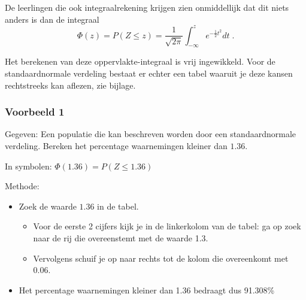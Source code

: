 \documentclass[a4paper,12pt, twoside]{article}
\begin{document}
\begin{center}
\end{center}

De leerlingen die ook integraalrekening krijgen zien onmiddellijk dat dit niets anders is dan de integraal
$$\Phi(z)=P(Z\leq z)=\dfrac{1}{\sqrt{2\pi}}\int_{-\infty}^{z}e^{-\frac{1}{2}t^2}dt\;.$$

Het berekenen van deze oppervlakte-integraal is vrij ingewikkeld. Voor de standaardnormale verdeling bestaat er echter een tabel waaruit je deze kansen rechtstreeks kan aflezen, zie bijlage.

\subsubsection*{Voorbeeld 1}

Gegeven: Een populatie die kan beschreven worden door een standaardnormale verdeling. Bereken het percentage waarnemingen kleiner dan $1.36$.

In symbolen: $\Phi(1.36)=P(Z\leq 1.36)$

Methode:
\begin{itemize}
  \item Zoek de waarde $1.36$ in de tabel.
  \begin{itemize}
    \item Voor de eerste 2 cijfers kijk je in de linkerkolom van de tabel: ga op zoek naar de rij die overeenstemt met de waarde 1.3.
    \item Vervolgens schuif je op naar rechts tot de kolom die overeenkomt met 0.06.
  \end{itemize}
  \item Het percentage waarnemingen kleiner dan 1.36 bedraagt dus 91.308\%
\end{itemize}
\end{document}

